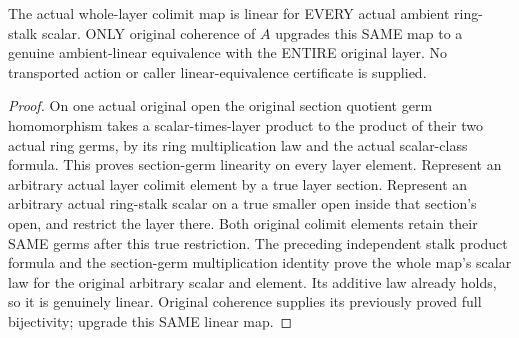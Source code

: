 \begin{theorem}
\label{hir:real-domain-actual-normal-layer-whole-stalk-ambient-linear-equivalence}
\leanok
The actual whole-layer colimit map is linear for EVERY actual ambient
ring-stalk scalar. ONLY original coherence of $A$ upgrades this SAME
map to a genuine ambient-linear equivalence with the ENTIRE original
layer. No transported action or caller linear-equivalence certificate
is supplied.
\end{theorem}
\begin{proof}
On one actual original open the original section quotient germ homomorphism
takes a scalar-times-layer product to the product of their two actual
ring germs, by its ring multiplication law and the actual scalar-class
formula. This proves section-germ linearity on every layer element.
Represent an arbitrary actual layer colimit element by a true layer
section. Represent an arbitrary actual ring-stalk scalar on a true
smaller open inside that section's open, and restrict the layer there.
Both original colimit elements retain their SAME germs after this true
restriction. The preceding independent stalk product formula and the
section-germ multiplication identity prove the whole map's scalar law
for the original arbitrary scalar and element. Its additive law already
holds, so it is genuinely linear. Original coherence supplies its
previously proved full bijectivity; upgrade this SAME linear map.
\end{proof}


